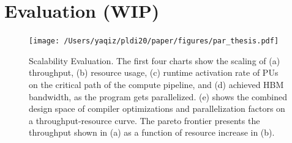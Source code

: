 \section{Evaluation (WIP)} \label{sec:eval}

\begin{figure}
\centering
\texttt{[image: /Users/yaqiz/pldi20/paper/figures/par\_thesis.pdf]}
\caption[Scalability Evaluation]{
  Scalability Evaluation. 
  The first four charts show the scaling of
  (a) throughput, 
  (b) resource usage, 
  (c) runtime activation rate of PUs on the critical path of the compute pipeline, 
  and (d) achieved HBM bandwidth, as the program gets parallelized.
  (e) shows the combined design space of compiler optimizations and parallelization factors on a
  throughput-resource curve. 
  The pareto frontier presents the throughput shown in (a) as a function of resource increase in
  (b).
}
\label{fig:par}
\end{figure}


